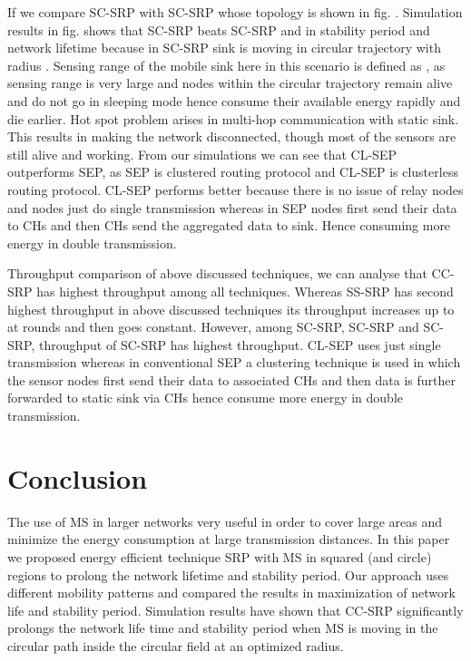 \documentclass{article}
\begin{document}
If we compare SC-SRP with SC-SRP whose topology is shown in fig. . Simulation results in fig.  shows that SC-SRP beats SC-SRP and in stability period and network lifetime because in SC-SRP sink is moving in circular trajectory with radius . Sensing range of the mobile sink here in this scenario is defined as , as sensing range is very large and nodes within the circular trajectory remain alive and do not go in sleeping mode hence consume their available energy rapidly and die earlier.
Hot spot problem arises in multi-hop communication with static sink. This results in making the network disconnected, though most of the sensors are still alive and working. From our simulations we can see that CL-SEP outperforms SEP, as SEP is clustered routing protocol and CL-SEP is clusterless routing protocol. CL-SEP performs better because there is no issue of relay nodes and nodes just do single transmission whereas in SEP nodes first send their data to CHs and then CHs send the aggregated data to sink. Hence consuming more energy in double transmission.


Throughput comparison of above discussed techniques, we can analyse that CC-SRP has highest throughput among all techniques.
Whereas SS-SRP has second highest throughput in above discussed techniques its throughput increases up to  at  rounds and then goes constant. However, among SC-SRP, SC-SRP and SC-SRP, throughput of SC-SRP has highest throughput.
CL-SEP uses just single transmission whereas in conventional SEP a clustering technique is used in which the sensor nodes first send their data to associated CHs and then data is further forwarded to static sink via CHs hence consume more energy in double transmission.

\vspace{-.7cm}
\section{Conclusion}
\vspace{-.5cm}
\label{sec:majhead}

The use of MS in larger networks very useful in order to cover large areas and minimize the energy consumption at large transmission distances. In this paper we proposed energy efficient technique SRP with MS in squared (and circle) regions to prolong the network lifetime and stability period. Our approach uses different mobility patterns and compared the results in maximization of network life and stability period. Simulation results have shown that CC-SRP significantly prolongs the network life time and stability period when MS is moving in the circular path inside the circular field at an optimized radius.
\end{document}
